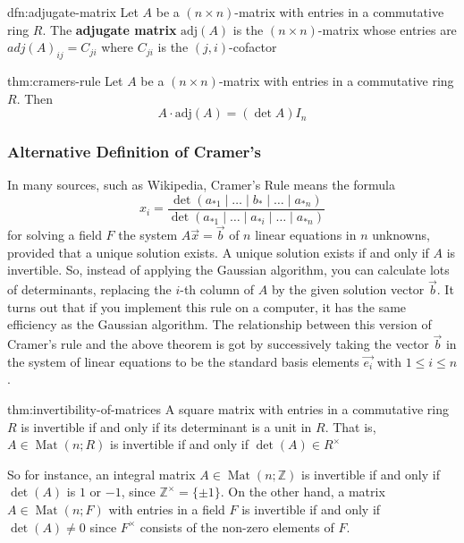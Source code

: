 \documentclass[landscape, 8pt]{extarticle}
\DeclareMathOperator{\Mat}{Mat}
\begin{document}
\begin{multicols}{3}
\begin{dfn}{dfn:adjugate-matrix}{}
    Let $A$ be a $(n \times n)$-matrix with entries in a commutative ring $R$. The \textbf{adjugate matrix} $\text{adj}(A)$ is the $(n \times n)$-matrix whose entries are $adj(A)_{ij} = C_{ji}$ where $C_{ji}$ is the $(j, i)$-cofactor
\end{dfn}

\begin{thm}{thm:cramers-rule}{}
    Let $A$ be a $(n \times n)$-matrix with entries in a commutative ring $R$. Then
    \[A \cdot \text{adj}(A) = (\det A)I_{n}\]
\end{thm}

\subsubsection{Alternative Definition of Cramer's}
In many sources, such as Wikipedia, Cramer's Rule means the formula
\[x_{i} = \frac{\det(a_{*1}\mid \dots \mid b_{*} \mid \dots \mid a_{*n})}{\det(a_{*1}\mid \dots \mid a_{*i} \mid \dots \mid a_{*n})}\]
for solving a field $F$ the system $A\vec{x} = \vec{b}$ of $n$ linear equations in $n$ unknowns, provided that a unique solution exists. A unique solution exists if and only if $A$ is invertible. So, instead of applying the Gaussian algorithm, you can calculate lots of determinants, replacing the $i$-th column of $A$ by the given solution vector $\vec{b}$. It turns out that if you implement this rule on a computer, it has the same efficiency as the Gaussian algorithm. The relationship between this version of Cramer's rule and the above theorem is got by successively taking the vector $\vec{b}$ in the system of linear equations to be the standard basis elements $\vec{e_{i}}$ with $1 \le i \le n$.

\begin{thm}{thm:invertibility-of-matrices}{}
    A square matrix with entries in a commutative ring $R$ is invertible if and only if its determinant is a unit in $R$. That is, $A\in \Mat(n;R)$ is invertible if and only if $\det(A)\in R^{\times}$
\end{thm}

So for instance, an integral matrix $A\in \Mat(n;\mathbb{Z})$ is invertible if and only if $\det(A)$ is $1$ or $-1$, since $\mathbb{Z}^{\times} = \{\pm 1\}$. On the other hand, a matrix $A\in \Mat(n;F)$ with entries in a field $F$ is invertible if and only if $\det(A)\ne 0$ since $F^{\times}$ consists of the non-zero elements of $F$.


\end{multicols}
\end{document}
